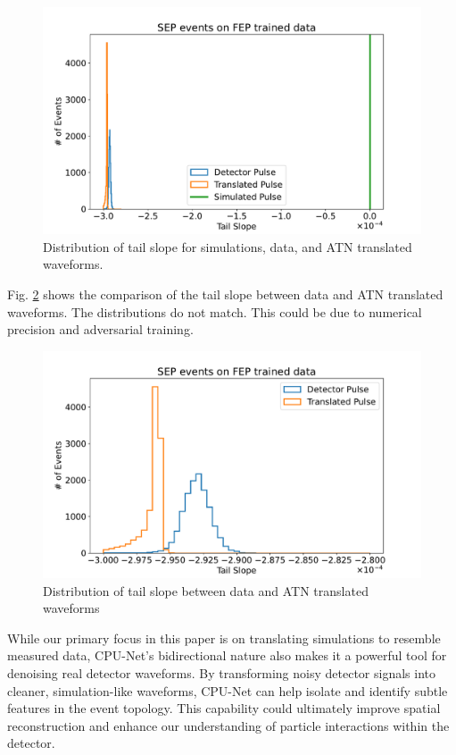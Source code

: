\begin{figure}%
\centering
\includegraphics[width=0.97\linewidth,trim={2pc 0pc 2pc 0pc},clip]{ch8/figs/SEP_sim_ts.pdf}
\caption{Distribution of tail slope for simulations, data, and ATN translated waveforms.}
\label{ch8_fig_tail_slope_comp}
\end{figure}

Fig. \ref{ch8_fig_tail_slope_sim} shows the comparison of the tail slope between data and ATN translated waveforms. The distributions do not match. This could be due to numerical precision and adversarial training.

\begin{figure}%
\centering
\includegraphics[width=0.9\linewidth,trim={2pc 0pc 2pc 0pc},clip]{ch8/figs/SEP_ts.pdf}
\caption{Distribution of tail slope between data and ATN translated waveforms}
\label{ch8_fig_tail_slope_sim}
\end{figure}

While our primary focus in this paper is on translating simulations to resemble measured data, CPU-Net’s bidirectional nature also makes it a powerful tool for denoising real detector waveforms. By transforming noisy detector signals into cleaner, simulation-like waveforms, CPU-Net can help isolate and identify subtle features in the event topology. This capability could ultimately improve spatial reconstruction and enhance our understanding of particle interactions within the detector.

